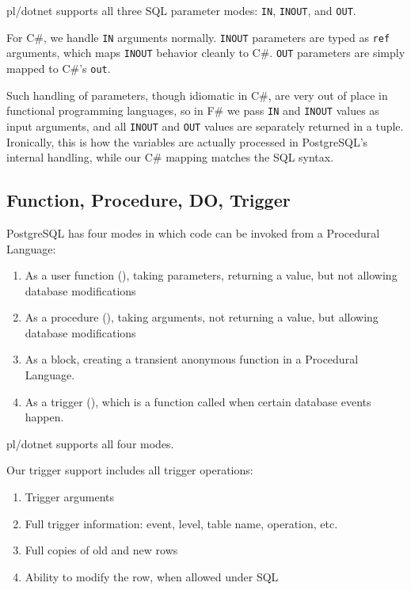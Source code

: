 \documentclass[sigconf,techreport,authorversion,nonacm]{acmart}
\begin{document}
pl/dotnet supports all three SQL parameter modes: \texttt{IN},
\texttt{INOUT}, and \texttt{OUT}.

For C\#, we handle \texttt{IN} arguments normally.  \texttt{INOUT}
parameters are typed as \texttt{ref} arguments, which maps
\texttt{INOUT} behavior cleanly to C\#.  \texttt{OUT} parameters
are simply mapped to C\#'s \texttt{out}.

Such handling of parameters, though idiomatic in C\#, are very out of
place in functional programming languages, so in F\# we pass \texttt{IN}
and \texttt{INOUT} values as input arguments, and all \texttt{INOUT}
and \texttt{OUT} values are separately returned in a tuple.  Ironically,
this is how the variables are actually processed in PostgreSQL's internal
handling, while our C\# mapping matches the SQL syntax.

\subsection{Function, Procedure, DO, Trigger}

PostgreSQL has four modes in which code can be invoked from a Procedural
Language:
\begin{enumerate}[itemsep=0pt]
    \item As a user function (), taking parameters, returning a value, but not allowing database modifications
    \item As a procedure (), taking arguments, not returning a value, but allowing database modifications
    \item As a  block, creating a transient anonymous function in a Procedural Language.
    \item As a trigger (), which is a function called when certain database events happen.
\end{enumerate}

pl/dotnet supports all four modes.

Our trigger support includes all trigger operations:
\begin{enumerate}[itemsep=0pt]
    \item Trigger arguments
    \item Full trigger information: event, level, table name, operation, etc.
    \item Full copies of old and new rows
    \item Ability to modify the row, when allowed under SQL
\end{enumerate}
\end{document}
